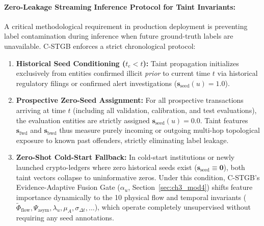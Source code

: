 \paragraph{Zero-Leakage Streaming Inference Protocol for Taint Invariants:}
A critical methodological requirement in production deployment is preventing label contamination during inference when future ground-truth labels are unavailable. C-STGB enforces a strict chronological protocol:
\begin{enumerate}
    \item \textbf{Historical Seed Conditioning ($t_e < t$):} Taint propagation initializes exclusively from entities confirmed illicit \textit{prior} to current time $t$ via historical regulatory filings or confirmed alert investigations ($\mathbf{s}_{\text{seed}}(u) = 1.0$).
    \item \textbf{Prospective Zero-Seed Assignment:} For all prospective transactions arriving at time $t$ (including all validation, calibration, and test evaluations), the evaluation entities are strictly assigned $\mathbf{s}_{\text{seed}}(u) = 0.0$. Taint features $\mathbf{s}_{\text{fwd}}$ and $\mathbf{s}_{\text{bwd}}$ thus measure purely incoming or outgoing multi-hop topological exposure to known past offenders, strictly eliminating label leakage.
    \item \textbf{Zero-Shot Cold-Start Fallback:} In cold-start institutions or newly launched crypto-ledgers where zero historical seeds exist ($\mathbf{s}_{\text{seed}} \equiv \mathbf{0}$), both taint vectors collapse to uninformative zeros. Under this condition, C-STGB's Evidence-Adaptive Fusion Gate ($\alpha_u$, Section~\ref{sec:ch3_mod4}) shifts feature importance dynamically to the 10 physical flow and temporal invariants ($\tilde{\Phi}_{\text{flow}}, \Psi_{\text{asym}}, \lambda_u, \mu_A, \sigma_{\Delta t}, \dots$), which operate completely unsupervised without requiring any seed annotations.
\end{enumerate}

